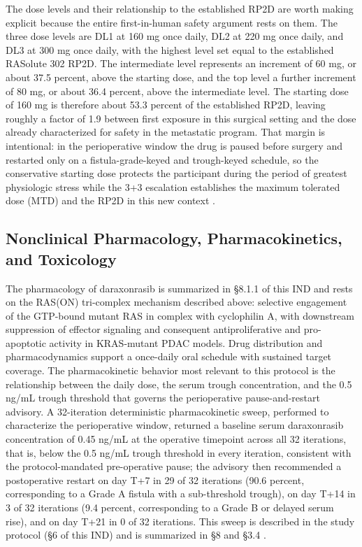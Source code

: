 The dose levels and their relationship to the established RP2D are worth making
explicit because the entire first-in-human safety argument rests on them. The
three dose levels are DL1 at 160 mg once daily, DL2 at 220 mg once daily, and DL3
at 300 mg once daily, with the highest level set equal to the established RASolute
302 RP2D. The intermediate level represents an increment of 60 mg, or about
37.5 percent, above the starting dose, and the top level a further increment of
80 mg, or about 36.4 percent, above the intermediate level. The starting dose of
160 mg is therefore about 53.3 percent of the established RP2D, leaving roughly a
factor of 1.9 between first exposure in this surgical setting and the dose already
characterized for safety in the metastatic program. That margin is intentional: in
the perioperative window the drug is paused before surgery and restarted only on a
fistula-grade-keyed and trough-keyed schedule, so the conservative starting dose
protects the participant during the period of greatest physiologic stress while the
3+3 escalation establishes the maximum tolerated dose (MTD) and the RP2D in this new
context \cite{daraxwhipple,oncotrialllm}.

\subsection*{Nonclinical Pharmacology, Pharmacokinetics, and Toxicology}

The pharmacology of daraxonrasib is summarized in \S 8.1.1 of this IND and rests on
the RAS(ON) tri-complex mechanism described above: selective engagement of the
GTP-bound mutant RAS in complex with cyclophilin A, with downstream suppression of
effector signaling and consequent antiproliferative and pro-apoptotic activity in
KRAS-mutant PDAC models. Drug distribution and pharmacodynamics support a
once-daily oral schedule with sustained target coverage. The pharmacokinetic
behavior most relevant to this protocol is the relationship between the daily dose,
the serum trough concentration, and the 0.5 ng/mL trough threshold that governs the
perioperative pause-and-restart advisory. A 32-iteration deterministic
pharmacokinetic sweep, performed to characterize the perioperative window,
returned a baseline serum daraxonrasib concentration of 0.45 ng/mL at the operative
timepoint across all 32 iterations, that is, below the 0.5 ng/mL trough threshold
in every iteration, consistent with the protocol-mandated pre-operative pause; the
advisory then recommended a postoperative restart on day T+7 in 29 of 32 iterations
(90.6 percent, corresponding to a Grade A fistula with a sub-threshold trough),
on day T+14 in 3 of 32 iterations (9.4 percent, corresponding to a Grade B or
delayed serum rise), and on day T+21 in 0 of 32 iterations. This sweep is
described in the study protocol (\S 6 of this IND) and is summarized in \S 8 and
\S 3.4 \cite{qspmetpancre,fdadigtwinpc,pdacdigtwinp}.

